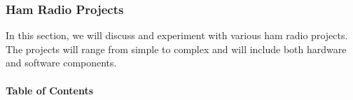 \subsubsection{Ham Radio Projects}

In this section, we will discuss and experiment with various ham radio projects. The projects will range from simple to complex and will include both hardware and software components.

\paragraph{Table of Contents}

\begin{verbatim}

\end{verbatim}